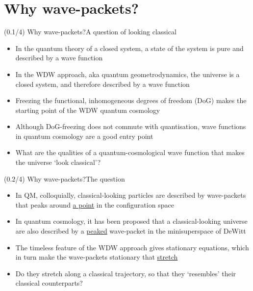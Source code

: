 \documentclass[mathserif]{beamer}
\begin{document}
\section{Why wave-packets?}


\begin{frame}{(0.1/4) Why wave-packets?}{A question of looking classical}
    \begin{itemize}
        \item
        In the quantum theory of a closed system, a state of the system
            is pure and described by a wave function
        \item
        In the WDW approach, aka quantum geometrodynamics, the
            universe is a closed system, and therefore described by a wave
            function
        \item
        Freezing the functional, inhomogeneous degrees
            of freedom (DoG) makes the starting point of the WDW quantum cosmology
        \item
        Although DoG-freezing does not commute with quantisation, wave functions in quantum cosmology are a good entry point
    \end{itemize}

    \begin{itemize}
        \item What are the qualities of a quantum-cosmological wave function 
            that makes the universe \alert{`look classical'}?
    \end{itemize}
\end{frame}

\begin{frame}{(0.2/4) Why wave-packets?}{The question}
    \begin{itemize}
        \item
        In QM, colloquially, classical-looking particles
        are described by wave-packets that peaks around \underline{a point} in 
        the configuration space
        \item
        In quantum cosmology, it has been proposed that a classical-looking 
        universe are also described by a \underline{peaked} wave-packet in the minisuperspace of DeWitt
        \item
        The timeless feature of the WDW approach gives stationary equations,
        which in turn make the wave-packets stationary that \underline{stretch}
    \end{itemize}

    \begin{itemize}
        \item
        Do they stretch \alert{along a classical trajectory}, so that they `resembles'
        their classical counterparts?
    \end{itemize}
\end{frame}
\end{document}
